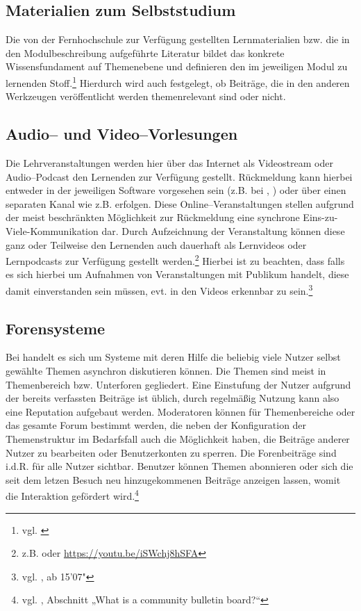 \subsection{Materialien zum Selbststudium} %
\label{sub:materialien_zum_selbststudium}
Die von der Fernhochschule zur Verfügung gestellten Lernmaterialien bzw. die in den Modulbeschreibung aufgeführte Literatur bildet das konkrete Wissensfundament auf Themenebene und definieren den im jeweiligen Modul zu lernenden Stoff.\footnote{vgl. \cite{pnikmail}} Hierdurch wird auch festgelegt, ob Beiträge, die in den anderen Werkzeugen veröffentlicht werden themenrelevant sind oder nicht.

\subsection{Audio– und Video–Vorlesungen} %
\label{sub:audio_und_video_vorlesungen}
Die Lehrveranstaltungen werden hier über das Internet als Videostream oder Audio–Podcast den Lernenden zur Verfügung gestellt. Rückmeldung kann hierbei entweder in der jeweiligen Software vorgesehen sein (z.B. bei , ) oder über einen separaten Kanal wie z.B.  erfolgen. Diese Online–Veranstaltungen stellen aufgrund der meist beschränkten Möglichkeit zur Rückmeldung eine synchrone Eins-zu-Viele-Kommunikation dar. Durch Aufzeichnung der Veranstaltung können diese ganz oder Teilweise den Lernenden auch dauerhaft als Lernvideos oder Lernpodcasts zur Verfügung gestellt werden.\footnote{z.B.  oder \url{https://youtu.be/iSWchj8hSFA}} Hierbei ist zu beachten, dass falls es sich hierbei um Aufnahmen von Veranstaltungen mit Publikum handelt, diese damit einverstanden sein müssen, evt. in den Videos erkennbar zu sein.\footnote{vgl. \cite{cs50}, ab 15'07" }

\subsection{Forensysteme} %
\label{sub:forensysteme}
Bei  handelt es sich um Systeme mit deren Hilfe die beliebig viele Nutzer selbst gewählte Themen asynchron diskutieren können. Die Themen sind meist in Themenbereich bzw. Unterforen gegliedert. Eine Einstufung der Nutzer aufgrund der bereits verfassten Beiträge ist üblich, durch regelmäßig Nutzung kann also eine Reputation aufgebaut werden. Moderatoren können für Themenbereiche oder das gesamte Forum bestimmt werden, die neben der Konfiguration der Themenstruktur im Bedarfsfall auch die Möglichkeit haben, die Beiträge anderer Nutzer zu bearbeiten oder Benutzerkonten zu sperren. Die Forenbeiträge sind i.d.R. für alle Nutzer sichtbar. Benutzer können Themen abonnieren oder sich die seit dem letzen Besuch neu hinzugekommenen Beiträge anzeigen lassen, womit die Interaktion gefördert wird.\footnote{vgl. \cite{vbulletin}, Abschnitt „What is a community bulletin board?“}


